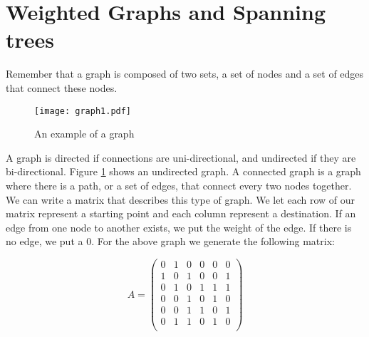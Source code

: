 %


\label{Ch:Kruskal}


\section*{Weighted Graphs and Spanning trees}

Remember that a graph is composed of two sets, a set of nodes and a set of edges that connect these nodes. 

\begin{figure}[H]
\texttt{[image: graph1.pdf]}
\caption{An example of a graph}
\label{mst:graph1}
\end{figure}

A graph is directed if connections are uni-directional, and undirected if they are bi-directional.
Figure \ref{mst:graph1} shows an undirected graph.
A connected graph is a graph where there is a path, or a set of edges, that connect every two nodes together.
We can write a matrix that describes this type of graph.
We let each row of our matrix represent a starting point and each column represent a destination.
If an edge from one node to another exists, we put the weight of the edge.
If there is no edge, we put a 0.
For the above graph we generate the following matrix:

\[
A = \begin{pmatrix}
0 & 1 & 0 & 0 & 0 & 0\\
1 & 0 & 1 & 0 & 0 & 1\\
0 & 1 & 0 & 1 & 1 & 1\\
0 & 0 & 1 & 0 & 1 & 0\\
0 & 0 & 1 & 1 & 0 & 1\\
0 & 1 & 1 & 0 & 1 & 0\\
\end{pmatrix}
\]

